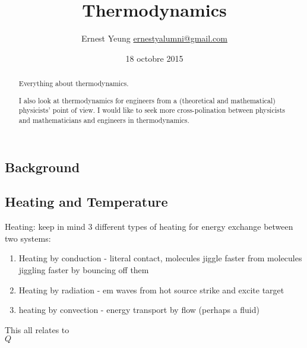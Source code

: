 \documentclass[10pt]{amsart}
\title{Thermodynamics}
\author{Ernest Yeung \href{mailto:ernestyalumni@gmail.com}{ernestyalumni@gmail.com}}
\date{18 octobre 2015}
\begin{document}

\maketitle

\tableofcontents

\begin{multicols*}{2}

\begin{abstract}
Everything about thermodynamics.  

I also look at thermodynamics for engineers from a (theoretical and mathematical) physicists' point of view.  I would like to seek more cross-polination between physicists and mathematicians and engineers in thermodynamics.
\end{abstract}


\section{Background}
\cite{RBaierlein1999}
\subsection{Heating and Temperature}

Heating: keep in mind 3 different types of heating for energy exchange between two systems:

\begin{enumerate}
  \item Heating by conduction - literal contact, molecules jiggle faster from molecules jiggling faster by bouncing off them
  \item Heating by radiation - em waves from hot source strike and excite target
  \item heating by convection - energy transport by flow (perhaps a fluid)
\end{enumerate}

This all relates to \\
$Q$


\end{multicols*}
\end{document}
